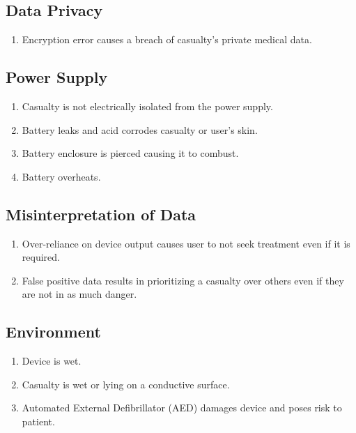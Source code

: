 \documentclass{article}
\begin{document}
    \subsection{Data Privacy}
        \begin{enumerate}[label = (\alph*)]
            \item Encryption error causes a breach of casualty's private medical data.
        \end{enumerate}

    \subsection{Power Supply}
        \begin{enumerate}[label = (\alph*)]
            \item Casualty is not electrically isolated from the power supply.
            \item Battery leaks and acid corrodes casualty or user's skin.
            \item Battery enclosure is pierced causing it to combust.
            \item Battery overheats.
        \end{enumerate}
            
    \subsection{Misinterpretation of Data}
        \begin{enumerate}[label = (\alph*)]
            \item Over-reliance on device output causes user to not seek treatment even if it is required.
            \item False positive data results in prioritizing a casualty over others even if they are not in as much danger.    
        \end{enumerate}
        
    \subsection{Environment}
        \begin{enumerate}[label = (\alph*)]
            \item Device is wet.  
            \item Casualty is wet or lying on a conductive surface.
            \item Automated External Defibrillator (AED) damages device and poses risk to patient.
        \end{enumerate}
\end{document}
